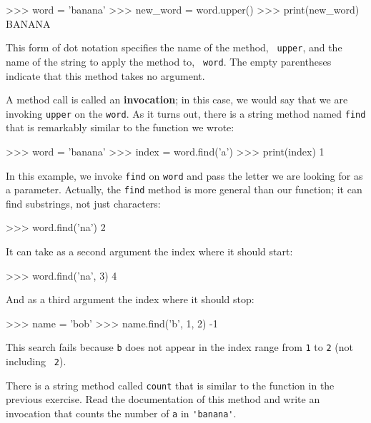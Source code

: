 
\beforeverb
\begin{pyinterpreter}
>>> word = 'banana'
>>> new_word = word.upper()
>>> print(new_word)
BANANA
\end{pyinterpreter}
\afterverb
%
This form of dot notation specifies the name of the method, {\tt
upper}, and the name of the string to apply the method to, {\tt
word}.  The empty parentheses indicate that this method takes no
argument.


A method call is called an {\bf invocation}; in this case, we would
say that we are invoking {\tt upper} on the {\tt word}.
%
%
As it turns out, there is a string method named {\tt find} that
is remarkably similar to the function we wrote:

\beforeverb
\begin{pyinterpreter}
>>> word = 'banana'
>>> index = word.find('a')
>>> print(index)
1
\end{pyinterpreter}
\afterverb
%
In this example, we invoke {\tt find} on {\tt word} and pass
the letter we are looking for as a parameter.
%
Actually, the {\tt find} method is more general than our function;
it can find substrings, not just characters:

\beforeverb
\begin{pyinterpreter}
>>> word.find('na')
2
\end{pyinterpreter}
\afterverb
%
It can take as a second argument the index where it should start:


\beforeverb
\begin{pyinterpreter}
>>> word.find('na', 3)
4
\end{pyinterpreter}
\afterverb
%
And as a third argument the index where it should stop:

\beforeverb
\begin{pyinterpreter}
>>> name = 'bob'
>>> name.find('b', 1, 2)
-1
\end{pyinterpreter}
\afterverb
%
This search fails because {\tt b} does not
appear in the index range from {\tt 1} to {\tt 2} (not including {\tt
2}).


\begin{exercise}

There is a string method called {\tt count} that is similar
to the function in the previous exercise.  Read the documentation
of this method
and write an invocation that counts the number of {\tt a}
in \verb"'banana'".
\end{exercise}


